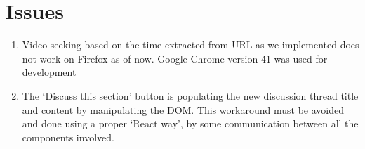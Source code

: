 \section{Issues}
\begin{enumerate}
\item Video seeking based on the time extracted from URL as we implemented does not work on Firefox as of now. Google Chrome version 41 was used for development
\item The `Discuss this section' button is populating the new discussion thread title and content by manipulating the DOM. This workaround must be avoided and done using a proper `React way', by some communication between all the components involved.
\end{enumerate}